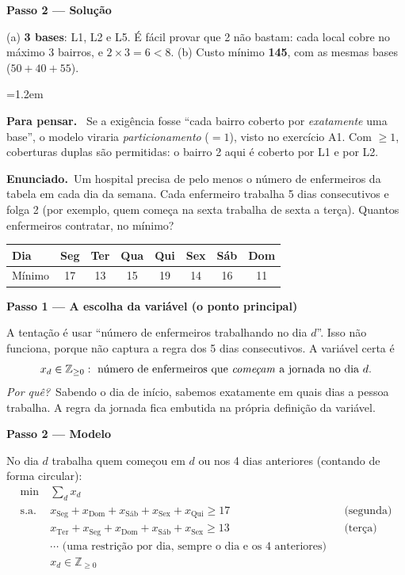 \documentclass[11pt,a4paper]{article}
\newcommand{\enunciado}{\par\textbf{Enunciado.}\ }
\newcommand{\passo}[1]{\par\medskip\textbf{#1}\par}
\newcommand{\porque}{\textit{Por quê?}\ }
\newenvironment{nota}[1]{\par\smallskip\begin{list}{}{\leftmargin=1.2em\rightmargin=0pt}\item[]\textbf{#1.}\ }{\end{list}}
\begin{document}
\passo{Passo 2 --- Solução}
(a) \textbf{3 bases}: L1, L2 e L5. É fácil provar que 2 não bastam: cada local cobre no máximo 3 bairros, e $2\times3=6<8$.
(b) Custo mínimo \textbf{145}, com as mesmas bases ($50+40+55$).

\begin{nota}{Para pensar}
Se a exigência fosse ``cada bairro coberto por \emph{exatamente} uma base'', o modelo viraria \emph{particionamento}
($=1$), visto no exercício A1. Com $\ge1$, coberturas duplas são permitidas: o bairro 2 aqui é coberto por L1 e por L2.
\end{nota}

\enunciado Um hospital precisa de pelo menos o número de enfermeiros da tabela em cada dia da semana. Cada enfermeiro
trabalha 5 dias consecutivos e folga 2 (por exemplo, quem começa na sexta trabalha de sexta a terça). Quantos
enfermeiros contratar, no mínimo?
\begin{center}
\begin{tabular}{lccccccc}
\toprule
Dia & Seg & Ter & Qua & Qui & Sex & Sáb & Dom\\
\midrule
Mínimo & 17 & 13 & 15 & 19 & 14 & 16 & 11\\
\bottomrule
\end{tabular}
\end{center}

\passo{Passo 1 --- A escolha da variável (o ponto principal)}
A tentação é usar ``número de enfermeiros trabalhando no dia $d$''. Isso não funciona, porque não captura a regra dos
5 dias consecutivos. A variável certa é
\[
  x_d \in \mathbb{Z}_{\ge0}: \text{ número de enfermeiros que \emph{começam} a jornada no dia } d .
\]
\porque Sabendo o dia de início, sabemos exatamente em quais dias a pessoa trabalha. A regra da jornada fica
embutida na própria definição da variável.

\passo{Passo 2 --- Modelo}
No dia $d$ trabalha quem começou em $d$ ou nos 4 dias anteriores (contando de forma circular):
\begin{align*}
  \min\ & \sum_d x_d\\
  \text{s.a.}\ & x_{\text{Seg}} + x_{\text{Dom}} + x_{\text{Sáb}} + x_{\text{Sex}} + x_{\text{Qui}} \ge 17 && \text{(segunda)}\\
  & x_{\text{Ter}} + x_{\text{Seg}} + x_{\text{Dom}} + x_{\text{Sáb}} + x_{\text{Sex}} \ge 13 && \text{(terça)}\\
  & \cdots \text{ (uma restrição por dia, sempre o dia e os 4 anteriores)}\\
  & x_d \in \mathbb{Z}_{\ge0}
\end{align*}
\end{document}
